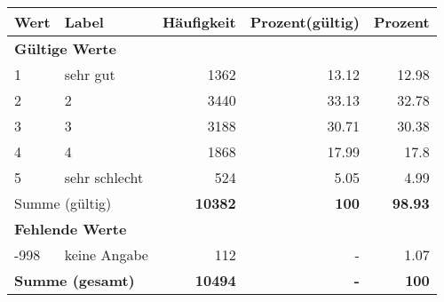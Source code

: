      \begin{longtable}{lXrrr}
     \toprule
     \textbf{Wert} & \textbf{Label} & \textbf{Häufigkeit} & \textbf{Prozent(gültig)} & \textbf{Prozent} \\
     \endhead
     \midrule
     \multicolumn{5}{l}{\textbf{Gültige Werte}}\\

     1 &
     \multicolumn{1}{X}{ sehr gut   } &


       \num{1362} &
       \num[round-mode=places,round-precision=2]{13,12} &
         \num[round-mode=places,round-precision=2]{12,98} \\

     2 &
     \multicolumn{1}{X}{ 2   } &


       \num{3440} &
       \num[round-mode=places,round-precision=2]{33,13} &
         \num[round-mode=places,round-precision=2]{32,78} \\

     3 &
     \multicolumn{1}{X}{ 3   } &


       \num{3188} &
       \num[round-mode=places,round-precision=2]{30,71} &
         \num[round-mode=places,round-precision=2]{30,38} \\

     4 &
     \multicolumn{1}{X}{ 4   } &


       \num{1868} &
       \num[round-mode=places,round-precision=2]{17,99} &
         \num[round-mode=places,round-precision=2]{17,8} \\

     5 &
     \multicolumn{1}{X}{ sehr schlecht   } &


       \num{524} &
       \num[round-mode=places,round-precision=2]{5,05} &
         \num[round-mode=places,round-precision=2]{4,99} \\
     \midrule
     \multicolumn{2}{l}{Summe (gültig)} &
       \textbf{\num{10382}} &
     \textbf{100} &
       \textbf{\num[round-mode=places,round-precision=2]{98,93}} \\
     \multicolumn{5}{l}{\textbf{Fehlende Werte}}\\
       -998 &
       keine Angabe &
         \num{112} &
        - &
         \num[round-mode=places,round-precision=2]{1,07} \\
     \midrule
     \multicolumn{2}{l}{\textbf{Summe (gesamt)}} &
          \textbf{\num{10494}} &
        \textbf{-} &
        \textbf{100} \\
     \bottomrule
     \end{longtable}
     
